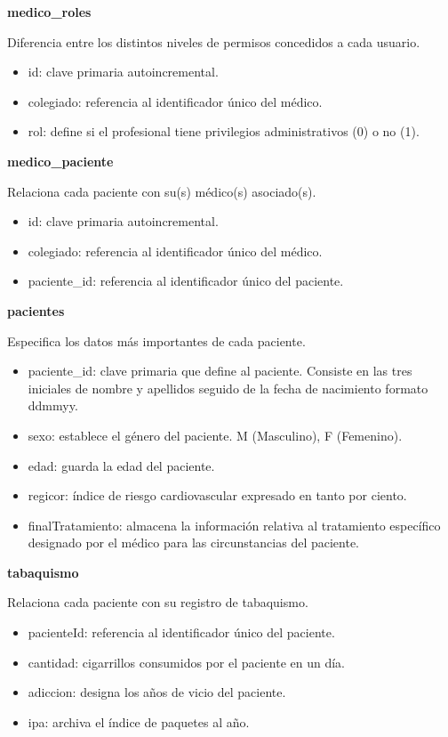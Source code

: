 \documentclass[11pt,spanish,
		listoftables,listoffigures]
		{tfgplantilla}
\begin{document}
\noindent
\textbf {medico\_roles}

Diferencia entre los distintos niveles de permisos concedidos a cada usuario.
\begin{itemize}
	\item id: clave primaria autoincremental.
	\item colegiado: referencia al identificador único del médico.
	\item rol: define si el profesional tiene privilegios administrativos (0) o no (1).
\end{itemize}

\noindent
\textbf {medico\_paciente}

Relaciona cada paciente con su(s) médico(s) asociado(s).
\begin{itemize}
	\item id: clave primaria autoincremental.
	\item colegiado: referencia al identificador único del médico.
	\item paciente\_id: referencia al identificador único del paciente.
\end{itemize}

\noindent
\textbf {pacientes}

Especifica los datos más importantes de cada paciente.
\begin{itemize}
	\item paciente\_id: clave primaria que define al paciente. Consiste en las tres iniciales de nombre y apellidos seguido de la fecha de nacimiento formato ddmmyy.
	\item sexo: establece el género del paciente. M (Masculino), F (Femenino).
	\item edad: guarda la edad del paciente.
	\item regicor: índice de riesgo cardiovascular expresado en tanto por ciento.
	\item finalTratamiento: almacena la información relativa al tratamiento específico designado por el médico para las circunstancias del paciente.
\end{itemize}

\noindent
\textbf {tabaquismo}

Relaciona cada paciente con su registro de tabaquismo.
\begin{itemize}
	\item pacienteId: referencia al identificador único del paciente.
	\item cantidad: cigarrillos consumidos por el paciente en un día.
	\item adiccion: designa los años de vicio del paciente.
	\item ipa: archiva el índice de paquetes al año.
\end{itemize}
\end{document}
